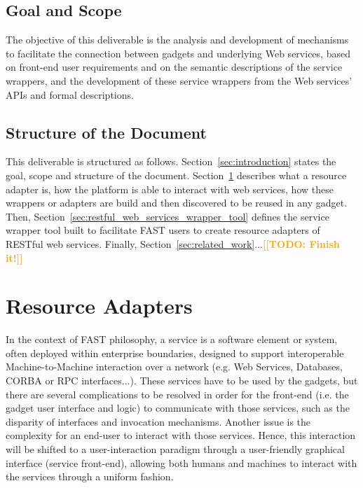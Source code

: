 \documentclass{fast_latex}
\newcommand{\todo}[1]{\textsf{\textbf{\textcolor{Orange}{[[TODO: #1]]}}}}
\newcommand{\todo}[1]{}
\begin{document}
\subsection{Goal and Scope} %
\label{sub:goal_and_scope}

The objective of this deliverable is the analysis and development of mechanisms to facilitate the connection between gadgets and underlying Web services, based on front-end user requirements and on the semantic descriptions of the service wrappers, and the development of these service wrappers from the Web services' APIs and formal descriptions.


\subsection{Structure of the Document} %
\label{sub:structure_of_the_document}

This deliverable is structured as follows. Section~\ref{sec:introduction} states the goal, scope and structure of the document. Section~\ref{sec:resource_adapters} describes what a resource adapter is, how the platform is able to interact with web services, how these wrappers or adapters are build and then discovered to be reused in any gadget. Then, Section~\ref{sec:restful_web_services_wrapper_tool} defines the service wrapper tool built to facilitate FAST users to create resource adapters of RESTful web services. Finally, Section~\ref{sec:related_work}...\todo{Finish it!}


\clearpage
\section{Resource Adapters} %
\label{sec:resource_adapters}

In the context of FAST philosophy, a service is a software element or system, often deployed within enterprise boundaries, designed to support interoperable Machine-to-Machine interaction over a network (e.g. Web Services, Databases, CORBA or RPC interfaces...). These services have to be used by the gadgets, but there are several complications to be resolved in order for the front-end (i.e. the gadget user interface and logic) to communicate with those services, such as the disparity of interfaces and invocation mechanisms. Another issue is the complexity for an end-user to interact with those services. Hence, this interaction will be shifted to a user-interaction paradigm through a user-friendly graphical interface (service front-end), allowing both humans and machines to interact with the services through a uniform fashion.
\end{document}
